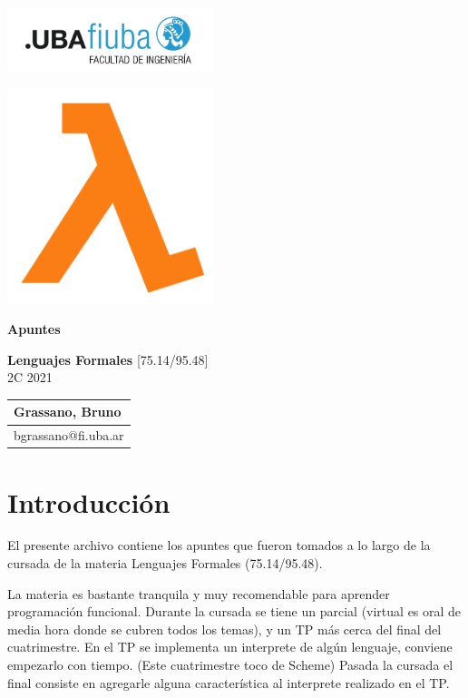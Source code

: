 \documentclass[titlepage,a4paper]{article}
\begin{document}
\begin{titlepage} %
	\hfill\includegraphics[width=6cm]{logofiuba.jpg}
    \centering
    \vfill
    
    \includegraphics[width=6cm]{img/lambda.png}
    
    \Huge \textbf{Apuntes}
    
    \Huge \textbf{Lenguajes Formales}
    \vskip2cm
    \Large [75.14/95.48]\\
    2C 2021 
    \vfill
    \begin{tabular}{ | l | } %
      \hline
      Grassano, Bruno \\ \hline
      bgrassano@fi.uba.ar \\ \hline
  	\end{tabular}
    \vfill
    \vfill
\end{titlepage}

\tableofcontents %

\newpage

\section{Introducción}\label{sec:intro}
El presente archivo contiene los apuntes que fueron tomados a lo largo de la cursada de la materia Lenguajes Formales (75.14/95.48).

La materia es bastante tranquila y muy recomendable para aprender programación funcional. Durante la cursada se tiene un parcial (virtual es oral de media hora donde se cubren todos los temas), y un TP más cerca del final del cuatrimestre. En el TP se implementa un interprete de algún lenguaje, conviene empezarlo con tiempo. (Este cuatrimestre toco de Scheme) Pasada la cursada el final consiste en agregarle alguna característica al interprete realizado en el TP.
\end{document}
